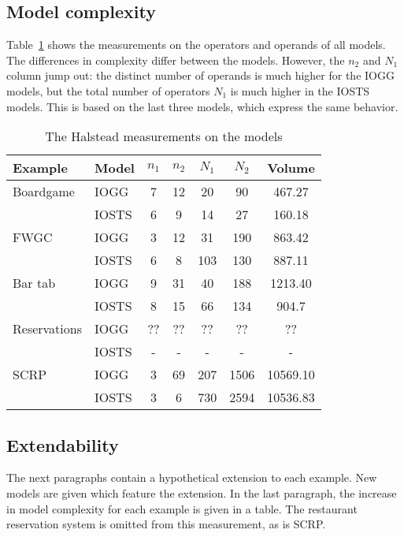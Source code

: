 \subsection{Model complexity}
Table~\ref{tab:halstead} shows the measurements on the operators and operands of all models.  The differences in complexity differ between the models. However, the $n_2$ and $N_1$ column jump out: the distinct number of operands is much higher for the IOGG models, but the total number of operators $N_1$ is much higher in the IOSTS models. This is based on the last three models, which express the same behavior.

\begin{table}[ht]
\begin{center}
\begin{tabular}{| l | l | c | c | c | c | c |}
  \hline
  \textbf{Example} & \textbf{Model} & $n_1$ & $n_2$ & $N_1$ & $N_2$ & Volume \\ \hline
  Boardgame & IOGG & 7 & 12 & 20 & 90 & 467.27 \\ \cline{2-7}
  & IOSTS & 6 & 9 & 14 & 27 & 160.18 \\ \hline
  FWGC & IOGG & 3 & 12 & 31 & 190 & 863.42 \\ \cline{2-7}
  & IOSTS & 6 & 8 & 103 & 130 & 887.11 \\ \hline
  Bar tab & IOGG & 9 & 31 & 40 & 188 & 1213.40 \\ \cline{2-7}
  & IOSTS & 8 & 15 & 66 & 134 & 904.7 \\ \hline
  Reservations & IOGG & ?? & ?? & ?? & ?? & ?? \\ \cline{2-7}
  & IOSTS & - & - & - & - & - \\ \hline
  SCRP & IOGG & 3 & 69 & 207 & 1506 & 10569.10 \\ \cline{2-7}
  & IOSTS & 3 & 6 & 730 & 2594 & 10536.83 \\ \hline
\end{tabular}
\end{center}
\caption{The Halstead measurements on the models}
\label{tab:halstead}
\end{table}

\subsection{Extendability}
The next paragraphs contain a hypothetical extension to each example. New models are given which feature the extension. In the last paragraph, the increase in model complexity for each example is given in a table. The restaurant reservation system is omitted from this measurement, as is SCRP.

